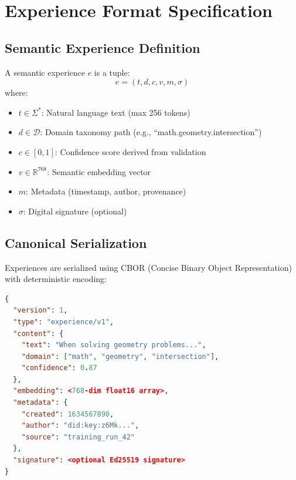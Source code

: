 \section{Experience Format Specification}

\label{sec:format}

\subsection{Semantic Experience Definition}

\begin{definition}
A semantic experience $e$ is a tuple:
\begin{equation}
e = (t, d, c, v, m, \sigma)
\end{equation}
where:
\begin{itemize}
    \item $t \in \Sigma^*$: Natural language text (max 256 tokens)
    \item $d \in \mathcal{D}$: Domain taxonomy path (e.g., ``math.geometry.intersection'')
    \item $c \in [0,1]$: Confidence score derived from validation
    \item $v \in \mathbb{R}^{768}$: Semantic embedding vector
    \item $m$: Metadata (timestamp, author, provenance)
    \item $\sigma$: Digital signature (optional)
\end{itemize}
\end{definition}

\subsection{Canonical Serialization}

Experiences are serialized using CBOR (Concise Binary Object Representation) with deterministic encoding:

\begin{lstlisting}[language=json,caption=Experience CBOR Schema]
{
  "version": 1,
  "type": "experience/v1",
  "content": {
    "text": "When solving geometry problems...",
    "domain": ["math", "geometry", "intersection"],
    "confidence": 0.87
  },
  "embedding": <768-dim float16 array>,
  "metadata": {
    "created": 1634567890,
    "author": "did:key:z6Mk...",
    "source": "training_run_42"
  },
  "signature": <optional Ed25519 signature>
}
\end{lstlisting}

